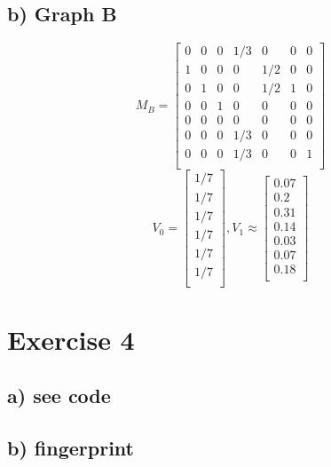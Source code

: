 \documentclass{article}
\begin{document}
\subsection*{b) Graph B}
\[
M_B   =
\left[   {\begin{array}{ccccccc}
0   &   0   &   0   &  1/3  &   0   &   0   &  0   \\
1   &   0   &   0   &   0   &  1/2  &   0   &  0     \\
0   &   1   &   0   &   0   &  1/2  &   1   &  0    \\
0   &   0   &   1   &   0   &   0   &   0   &  0     \\
0   &   0   &   0   &   0   &   0   &   0   &  0    \\
0   &   0   &   0   &  1/3  &   0   &   0   &  0    \\
0   &   0   &   0   &  1/3  &   0   &   0   &  1    \\
\end{array}   }   \right]
\]
\[
V_0   =
\left[   {\begin{array}{c}
1/7\\
1/7\\
1/7\\
1/7\\
1/7\\
1/7\\
\end{array}   }   \right],
V_1 \approx
\left[   {\begin{array}{c}
0.07 \\
0.2\\
0.31\\
0.14\\
0.03\\
0.07\\
0.18\\
\end{array}   }   \right]
\]


\vspace{2cm}
\section*{Exercise 4}
\subsection*{a) see code}
\subsection*{b) fingerprint}
\end{document}
